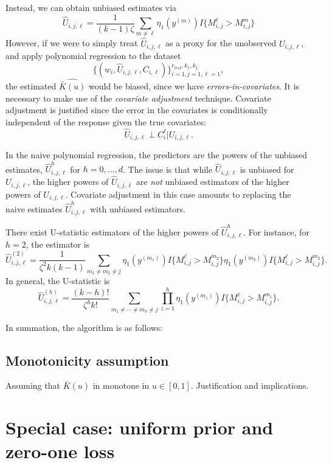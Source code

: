 \documentclass[12pt]{article}
\begin{document}
Instead, we can obtain unbiased estimates via
\[
\hat{U}_{i,j, \ell} = \frac{1}{(k-1)\zeta}\sum_{m \neq \ell} \eta_1(y^{(m)}) I\{M_{i, j}^\ell > M_{i, j}^m\}
\]
However, if we were to simply treat $\hat{U}_{i, j, \ell}$ as a proxy
for the unobserved $U_{i,j,\ell}$, and apply polynomial regression to
the dataset
\[
\{(w_i, \hat{U}_{i,j, \ell}, C_{i, \ell})\}_{i=1, j=1, \ell=1}^{r_{test}, k_1,k_1},
\]
the estimated $\widehat{\bar{K}(u)}$ would be biased, since we have
\emph{errors-in-covariates}.  It is necessary to make use of the
\emph{covariate adjustment} technique.  Covariate adjustment is
justified since the error in the covariates is conditionally
independent of the response given the true covariates:
\[
\hat{U}_{i,j,\ell} \perp C_i^\ell | U_{i, j,\ell}.
\]

In the naive polynomial regression, the predictors are the powers of
the unbiased estimates, $\hat{U}_{i,j,\ell}^h$ for $h = 0,\hdots, d$.
The issue is that while $\hat{U}_{i,j,\ell}$ is unbiased for
$U_{i,j,\ell}$, the higher powers of $\hat{U}_{i,j,\ell}$ are
\emph{not} unbiased estimators of the higher powers of $U_{i,j,\ell}$.
Covariate adjustment in this case amounts to replacing the naive
estimates $\hat{U}_{i,j,\ell}^h$ with unbiased estimators.

There exist U-statistic estimators of the higher powers of
$\hat{U}_{i,j,\ell}^h$.  For instance, for $h=2$, the estimator is
\[
\hat{U}_{i,j,\ell}^{(2)} = \frac{1}{\zeta^2 k(k-1)} \sum_{m_1\neq m_2 \neq j} \eta_1(y^{(m_1)}) I\{M_{i, j}^\ell > M_{i, j}^{m_2}\}
\eta_1(y^{(m_2)}) I\{M_{i, j}^\ell > M_{i, j}^{m_2}\}.
\]
In general, the U-statistic is
\[
\hat{U}_{i, j, \ell}^{(h)} = \frac{(k-h)!}{\zeta^h k!} \sum_{m_1 \neq \cdots \neq m_h \neq j} \prod_{z=1}^h \eta_1(y^{(m_z)}) I\{M_{i, j}^\ell > M_{i, j}^{m_z}\}.
\]

In summation, the algorithm is as follows:

\subsection{Monotonicity assumption}

Assuming that $\bar{K}(u)$ in monotone in $u \in [0,1]$.
Justification and implications.

\section{Special case: uniform prior and zero-one loss}
\end{document}
